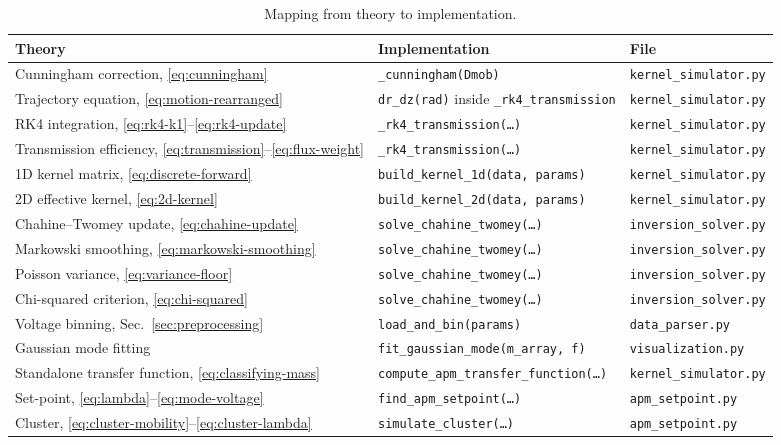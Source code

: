 \documentclass[11pt,a4paper]{article}
\begin{document}
\begin{table}[htbp]
  \caption{Mapping from theory to implementation.}
  \label{tab:implementation}
  \centering
  \small
  \begin{tabular}{lll}
    \toprule
    Theory & Implementation & File \\
    \midrule
    Cunningham correction, \eqref{eq:cunningham}
      & \texttt{\_cunningham(Dmob)}
      & \texttt{kernel\_simulator.py} \\
    Trajectory equation, \eqref{eq:motion-rearranged}
      & \texttt{dr\_dz(rad)} inside \texttt{\_rk4\_transmission}
      & \texttt{kernel\_simulator.py} \\
    RK4 integration, \eqref{eq:rk4-k1}--\eqref{eq:rk4-update}
      & \texttt{\_rk4\_transmission(\ldots)}
      & \texttt{kernel\_simulator.py} \\
    Transmission efficiency, \eqref{eq:transmission}--\eqref{eq:flux-weight}
      & \texttt{\_rk4\_transmission(\ldots)}
      & \texttt{kernel\_simulator.py} \\
    1D kernel matrix, \eqref{eq:discrete-forward}
      & \texttt{build\_kernel\_1d(data, params)}
      & \texttt{kernel\_simulator.py} \\
    2D effective kernel, \eqref{eq:2d-kernel}
      & \texttt{build\_kernel\_2d(data, params)}
      & \texttt{kernel\_simulator.py} \\
    Chahine--Twomey update, \eqref{eq:chahine-update}
      & \texttt{solve\_chahine\_twomey(\ldots)}
      & \texttt{inversion\_solver.py} \\
    Markowski smoothing, \eqref{eq:markowski-smoothing}
      & \texttt{solve\_chahine\_twomey(\ldots)}
      & \texttt{inversion\_solver.py} \\
    Poisson variance, \eqref{eq:variance-floor}
      & \texttt{solve\_chahine\_twomey(\ldots)}
      & \texttt{inversion\_solver.py} \\
    Chi-squared criterion, \eqref{eq:chi-squared}
      & \texttt{solve\_chahine\_twomey(\ldots)}
      & \texttt{inversion\_solver.py} \\
    Voltage binning, Sec.~\ref{sec:preprocessing}
      & \texttt{load\_and\_bin(params)}
      & \texttt{data\_parser.py} \\
    Gaussian mode fitting
      & \texttt{fit\_gaussian\_mode(m\_array, f)}
      & \texttt{visualization.py} \\
    Standalone transfer function, \eqref{eq:classifying-mass}
      & \texttt{compute\_apm\_transfer\_function(\ldots)}
      & \texttt{kernel\_simulator.py} \\
    Set-point, \eqref{eq:lambda}--\eqref{eq:mode-voltage}
      & \texttt{find\_apm\_setpoint(\ldots)}
      & \texttt{apm\_setpoint.py} \\
    Cluster, \eqref{eq:cluster-mobility}--\eqref{eq:cluster-lambda}
      & \texttt{simulate\_cluster(\ldots)}
      & \texttt{apm\_setpoint.py} \\
    \bottomrule
  \end{tabular}
\end{table}
\end{document}
